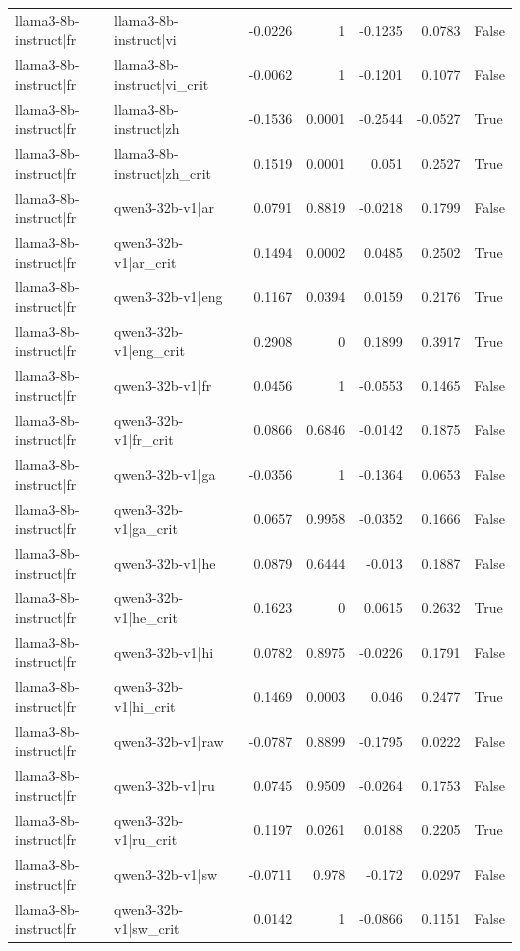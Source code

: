 \begin{table}
\begin{tabular}{l l r r r r l}
llama3-8b-instruct|fr & llama3-8b-instruct|vi & -0.0226 & 1 & -0.1235 & 0.0783 & False \\
llama3-8b-instruct|fr & llama3-8b-instruct|vi_crit & -0.0062 & 1 & -0.1201 & 0.1077 & False \\
llama3-8b-instruct|fr & llama3-8b-instruct|zh & -0.1536 & 0.0001 & -0.2544 & -0.0527 & True \\
llama3-8b-instruct|fr & llama3-8b-instruct|zh_crit & 0.1519 & 0.0001 & 0.051 & 0.2527 & True \\
llama3-8b-instruct|fr & qwen3-32b-v1|ar & 0.0791 & 0.8819 & -0.0218 & 0.1799 & False \\
llama3-8b-instruct|fr & qwen3-32b-v1|ar_crit & 0.1494 & 0.0002 & 0.0485 & 0.2502 & True \\
llama3-8b-instruct|fr & qwen3-32b-v1|eng & 0.1167 & 0.0394 & 0.0159 & 0.2176 & True \\
llama3-8b-instruct|fr & qwen3-32b-v1|eng_crit & 0.2908 & 0 & 0.1899 & 0.3917 & True \\
llama3-8b-instruct|fr & qwen3-32b-v1|fr & 0.0456 & 1 & -0.0553 & 0.1465 & False \\
llama3-8b-instruct|fr & qwen3-32b-v1|fr_crit & 0.0866 & 0.6846 & -0.0142 & 0.1875 & False \\
llama3-8b-instruct|fr & qwen3-32b-v1|ga & -0.0356 & 1 & -0.1364 & 0.0653 & False \\
llama3-8b-instruct|fr & qwen3-32b-v1|ga_crit & 0.0657 & 0.9958 & -0.0352 & 0.1666 & False \\
llama3-8b-instruct|fr & qwen3-32b-v1|he & 0.0879 & 0.6444 & -0.013 & 0.1887 & False \\
llama3-8b-instruct|fr & qwen3-32b-v1|he_crit & 0.1623 & 0 & 0.0615 & 0.2632 & True \\
llama3-8b-instruct|fr & qwen3-32b-v1|hi & 0.0782 & 0.8975 & -0.0226 & 0.1791 & False \\
llama3-8b-instruct|fr & qwen3-32b-v1|hi_crit & 0.1469 & 0.0003 & 0.046 & 0.2477 & True \\
llama3-8b-instruct|fr & qwen3-32b-v1|raw & -0.0787 & 0.8899 & -0.1795 & 0.0222 & False \\
llama3-8b-instruct|fr & qwen3-32b-v1|ru & 0.0745 & 0.9509 & -0.0264 & 0.1753 & False \\
llama3-8b-instruct|fr & qwen3-32b-v1|ru_crit & 0.1197 & 0.0261 & 0.0188 & 0.2205 & True \\
llama3-8b-instruct|fr & qwen3-32b-v1|sw & -0.0711 & 0.978 & -0.172 & 0.0297 & False \\
llama3-8b-instruct|fr & qwen3-32b-v1|sw_crit & 0.0142 & 1 & -0.0866 & 0.1151 & False \\

\end{tabular}
\end{table}
